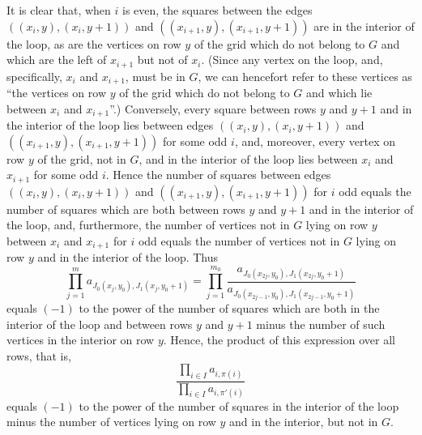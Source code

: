 \documentclass[10pt,reqno]{amsart}
\theoremstyle{plain}
\theoremstyle{definition}
\theoremstyle{remark}
\begin{document}
It is clear that, when $i$ is even, the squares between 
the edges $((x_i,y),(x_i,y+1))$ and 
$((x_{i+1},y),(x_{i+1},y+1))$ are in the interior of the loop, as are
the vertices on row $y$ of the grid which do not belong to $G$ and which
are the left of $x_{i+1}$ but not
of $x_i$. (Since any vertex on the loop, and, specifically, $x_i$ and
$x_{i+1}$, must be in $G$, we can hencefort refer to these vertices
as ``the vertices on row $y$ of the grid which do not belong to $G$ and
which lie between $x_i$ and $x_{i+1}$''.) Conversely, every square between
rows $y$ and $y+1$ and in the interior of the loop lies between edges
 $((x_i,y),(x_i,y+1))$ and  $((x_{i+1},y),(x_{i+1},y+1))$ for some odd $i$,
and, moreover,
 every vertex on row $y$ of the grid, not in $G$, and in the interior
of the loop lies between $x_i$ and $x_{i+1}$ for some odd $i$.
Hence the number of squares between edges $((x_i,y),(x_i,y+1))$
and  $((x_{i+1},y),(x_{i+1},y+1))$ for $i$ odd equals the number of
squares which are both 
between rows $y$ and $y+1$ and in the interior of the loop, and, furthermore,
the number of vertices not in
$G$ lying on row $y$ between $x_i$ and $x_{i+1}$ for $i$ odd equals the
number of vertices not in $G$ lying on row $y$ and in the interior of the loop.
Thus 
\begin{equation}\prod_{j=1}^m a_{J_0(x_j,y_0),J_1(x_j,y_0+1)} =
  \prod_{j=1}^{m_0} \frac{a_{J_0(x_{2j},y_0),J_1(x_{2j},y_0+1)}}
			 {a_{J_0(x_{2j-1},y_0),J_1(x_{2j-1},y_0+1)}} \end{equation}
equals $(-1)$ to the power of
the number of squares which are both
in the interior of the loop and between rows $y$ and $y+1$
minus the number of such vertices in the interior on row $y$.
Hence, the product of this expression over all rows, that is,
\begin{equation}
\frac{\prod_{i\in I} a_{i,\pi(i)}}{\prod_{i\in I} a_{i,\pi \prime (i)}}
\end{equation}
 equals $(-1)$ to the power of
the number of squares in the interior of the loop minus the number of vertices
lying on row $y$ and in the interior, but not in $G$. 
\end{document}
